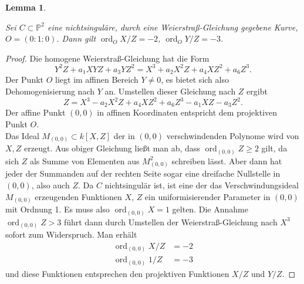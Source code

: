 \documentclass{amsart}
\theoremstyle{plain}
\newtheorem{lemma}[subsection]{Lemma}
\theoremstyle{definition}
\newcommand{\projspace}{\mathds{P}}
\newcommand{\ord}{\operatorname{ord}}
\begin{document}
\begin{lemma}
	\label{lem-polordnungen}

	Sei $C \subset \projspace^2$ eine nichtsinguläre, durch eine Weierstraß-Gleichung gegebene Kurve, $O = (0 : 1 : 0)$.
	Dann gilt $\ord_O X/Z = -2$, $\ord_O Y/Z = -3$.
\end{lemma}
\begin{proof}
	Die homogene Weierstraß-Gleichung hat die Form
	\begin{equation*}
		Y^2 Z + a_1 X Y Z + a_3 Y Z^2 = X^3 + a_2 X^2  Z + a_4 X Z^2 + a_6 Z^3.
	\end{equation*}
	Der Punkt $O$ liegt im affinen Bereich $Y \neq 0$, es bietet sich also Dehomogenisierung nach $Y$ an.
	Umstellen dieser Gleichung nach $Z$ ergibt
	\begin{equation*}
		Z = X^3 - a_2 X^2 Z + a_4 X Z^2 + a_6 Z^3 - a_1 X Z - a_3 Z^2.
	\end{equation*}
	Der affine Punkt $(0, 0)$ in affinen Koordinaten entspricht dem projektiven Punkt $O$. \\
	Das Ideal $M_{(0, 0)} \subset k[X, Z]$ der in $(0, 0)$ verschwindenden Polynome wird von $X, Z$ erzeugt.
	Aus obiger Gleichung ließt man ab, dass $\ord_{(0, 0)} Z \geq 2$ gilt, da sich $Z$ als Summe von Elementen aus $M_{(0, 0)}^2$ schreiben lässt.
	Aber dann hat jeder der Summanden auf der rechten Seite sogar eine dreifache Nullstelle in $(0, 0)$, also auch $Z$.
	Da $C$ nichtsingulär ist, ist eine der das Verschwindungsideal $M_{(0, 0)}$ erzeugenden Funktionen $X$, $Z$ ein uniformisierender Parameter in $(0, 0)$ mit Ordnung 1.
	Es muss also $\ord_{(0, 0)} X = 1$ gelten.
	Die Annahme $\ord_{(0, 0)} Z > 3$ führt dann durch Umstellen der Weierstraß-Gleichung nach $X^3$ sofort zum Widerspruch.
	Man erhält
	\begin{align*}
		\ord_{(0, 0)} X / Z & = -2 \\
		\ord_{(0, 0)} 1 / Z & = -3
	\end{align*}
	und diese Funktionen entsprechen den projektiven Funktionen $X / Z$ und $Y / Z$.
\end{proof}
\end{document}
